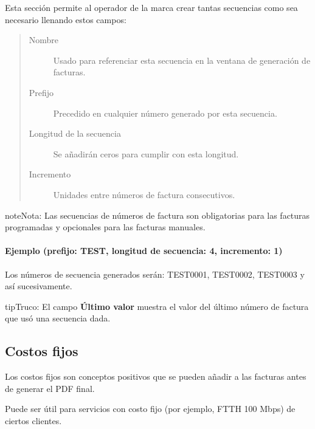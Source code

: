 \documentclass[letterpaper,10pt,spanish]{sphinxmanual}
\begin{document}
Esta sección permite al operador de la marca crear tantas secuencias como sea necesario llenando estos campos:
\begin{quote}
\begin{description}
\item[{Nombre}] \leavevmode
Usado para referenciar esta secuencia en la ventana de generación de facturas.

\item[{Prefijo}] \leavevmode
Precedido en cualquier número generado por esta secuencia.

\item[{Longitud de la secuencia}] \leavevmode
Se añadirán ceros para cumplir con esta longitud.

\item[{Incremento}] \leavevmode
Unidades entre números de factura consecutivos.

\end{description}
\end{quote}

\begin{notice}{note}{Nota:}
Las secuencias de números de factura son obligatorias para las facturas programadas y opcionales para las facturas manuales.
\end{notice}
\paragraph{Ejemplo (prefijo: TEST, longitud de secuencia: 4, incremento: 1)}

Los números de secuencia generados serán: TEST0001, TEST0002, TEST0003 y así sucesivamente.

\begin{notice}{tip}{Truco:}
El campo \textbf{Último valor} muestra el valor del último número de factura que usó una secuencia dada.
\end{notice}


\subsection{Costos fijos}
\label{administration_portal/brand/invoicing/fixed_costs:fixed-costs}\label{administration_portal/brand/invoicing/fixed_costs::doc}\label{administration_portal/brand/invoicing/fixed_costs:id1}
Los costos fijos son conceptos positivos que se pueden añadir a las facturas antes de generar el PDF final.

Puede ser útil para servicios con costo fijo (por ejemplo, FTTH 100 Mbps) de ciertos clientes.
\end{document}
